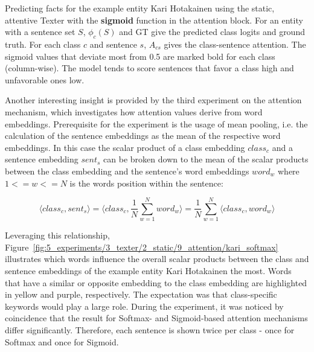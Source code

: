 \begin{table}[h]
    \centering
    
    \caption{Predicting facts for the example entity Kari Hotakainen using the static, attentive Texter with the \textbf{sigmoid} function in the attention block. For an entity with a sentence set $S$, $\phi_c(S)$ and GT give the predicted class logits and ground truth. For each class $c$ and sentence $s$, $A_{cs}$ gives the class-sentence attention. The sigmoid values that deviate most from 0.5 are marked bold for each class (column-wise). The model tends to score sentences that favor a class high and unfavorable ones low.}
    \label{tab:5_experiments/3_texter/2_static/9_attention/kari}
\end{table}

Another interesting insight is provided by the third experiment on the attention mechanism, which investigates how attention values derive from word embeddings. Prerequisite for the experiment is the usage of mean pooling, i.e. the calculation of the sentence embeddings as the mean of the respective word embeddings. In this case the scalar product of a class embedding $class_c$ and a sentence embedding $sent_s$ can be broken down to the mean of the scalar products between the class embedding and the sentence's word embeddings $word_w$ where $1 <= w <= N$ is the words position within the sentence:

\[
    \langle class_c, sent_s \rangle
    = \langle class_c, \frac{1}{N} \sum_{w=1}^N word_w \rangle
    = \frac{1}{N} \sum_{w=1}^N \langle class_c, word_w \rangle
\]

Leveraging this relationship, Figure~\ref{fig:5_experiments/3_texter/2_static/9_attention/kari_softmax} illustrates which words influence the overall scalar products between the class and sentence embeddings of the example entity Kari Hotakainen the most. Words that have a similar or opposite embedding to the class embedding are highlighted in yellow and purple, respectively. The expectation was that class-specific keywords would play a large role. During the experiment, it was noticed by coincidence that the result for Softmax- and Sigmoid-based attention mechanisms differ significantly. Therefore, each sentence is shown twice per class - once for Softmax and once for Sigmoid.

